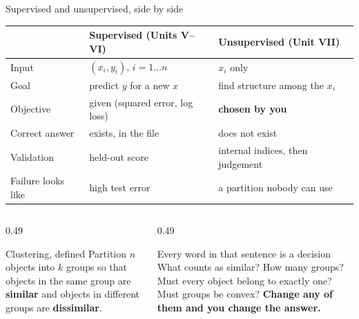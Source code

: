 \documentclass[aspectratio=169]{beamer}
\begin{document}
\begin{frame}[shrink=8]{Supervised and unsupervised, side by side}
  \begin{center}
    \small
    \begin{tabular}{@{}lll@{}}
      \toprule
      & \textbf{Supervised} (Units V--VI) & \textbf{Unsupervised} (Unit VII) \\
      \midrule
      Input      & $(x_i, y_i)$, $i = 1 \dots n$ & $x_i$ only \\
      Goal       & predict $y$ for a new $x$ & find structure among the $x_i$ \\
      Objective  & given (squared error, log loss) & \textbf{chosen by you} \\
      Correct answer & exists, in the file & does not exist \\
      Validation & held-out score & internal indices, then judgement \\
      Failure looks like & high test error & a partition nobody can use \\
      \bottomrule
    \end{tabular}
  \end{center}
  \vspace{0.2em}
  \begin{columns}[T]
    \begin{column}{0.49\textwidth}
      \begin{block}{Clustering, defined}
        Partition $n$ objects into $k$ groups so that objects in the same
        group are \textbf{similar} and objects in different groups are
        \textbf{dissimilar}.
      \end{block}
    \end{column}
    \begin{column}{0.49\textwidth}
      \begin{alertblock}{Every word in that sentence is a decision}
        What counts as similar? How many groups? Must every object belong to
        exactly one? Must groups be convex? \textbf{Change any of them and
        you change the answer.}
      \end{alertblock}
    \end{column}
  \end{columns}
\end{frame}
\end{document}
